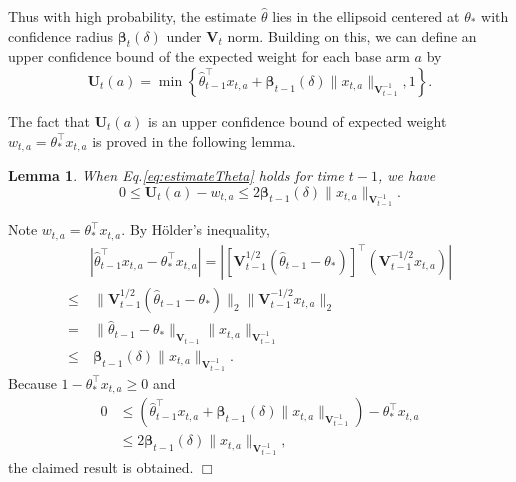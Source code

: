 \documentclass{article}
\newcommand{\bbeta}{\boldsymbol{\beta}}
\newcommand{\bU}{\mathbf{U}}
\newcommand{\bV}{\mathbf{V}}
\newcommand{\abs}[1]{\left| #1 \right|}
\newcommand{\norm}[1]{\| #1 \|}
\newtheorem{lemma}[theorem]{Lemma}%
\newenvironment{proof}{\noindent {\textbf{Proof. }}}{$\Box$ \medskip}
\begin{document}
Thus with high probability, the estimate $\hat{\theta}$ lies in the ellipsoid centered at $\theta_*$ with confidence radius $\bbeta_t(\delta)$ under $\bV_t$ norm. 
Building on this, we can define an upper confidence bound of the expected weight for each base arm $a$ by
\begin{equation}
  \label{eq:defU}
  \bU_t(a) = \min\left\{\hat{\theta}_{t-1}^{\top}x_{t,a} + \bbeta_{t-1}(\delta)\norm{x_{t,a}}_{\bV_{t-1}^{-1}}, 1 \right\}.
\end{equation}

The fact that $\bU_t(a)$ is an upper confidence bound of expected weight $w_{t, a} = \theta_*^{\top} x_{t,a}$ is proved in the following lemma.
\begin{lemma} %
  \label{lem:estimateU}
  When Eq.\eqref{eq:estimateTheta} holds for time $t-1$, we have
  $$
    0 \leq \bU_t(a) - w_{t,a} \leq 2 \bbeta_{t-1}(\delta)\norm{x_{t,a}}_{\bV_{t-1}^{-1}}.
  $$
\end{lemma}
\begin{proof}
	Note $w_{t,a} = \theta_*^{\top} x_{t,a}$. By H\"{o}lder's inequality,
	\begin{align*}
		&\abs{\hat{\theta}_{t-1}^{\top}x_{t,a} - \theta_{\ast}^{\top}x_{t,a}} = \abs{[\bV_{t-1}^{1/2}(\hat{\theta}_{t-1} - \theta_{\ast})]^{\top} (\bV_{t-1}^{-1/2}x_{t,a})}\\
		\leq &~\norm{\bV_{t-1}^{1/2}(\hat{\theta}_{t-1} - \theta_{\ast})}_2 \norm{\bV_{t-1}^{-1/2}x_{t,a}}_2\\
		=&~\norm{\hat{\theta}_{t-1} - \theta_{\ast}}_{\bV_{t-1}} \norm{x_{t,a}}_{\bV_{t-1}^{-1}} \\
		\leq&~ \bbeta_{t-1}(\delta)\norm{x_{t,a}}_{\bV_{t-1}^{-1}}.
	\end{align*}
	Because $1 - \theta_*^{\top} x_{t,a} \geq 0$ and
	\begin{align*}
		0 &\leq (\hat{\theta}_{t-1}^{\top}x_{t,a} + \bbeta_{t-1}(\delta)\norm{x_{t,a}}_{\bV_{t-1}^{-1}}) - \theta_{\ast}^{\top}x_{t,a} \\
		&\leq 2 \bbeta_{t-1}(\delta)\norm{x_{t,a}}_{\bV_{t-1}^{-1}},
	\end{align*}
	the claimed result is obtained.
\end{proof}
\end{document}

